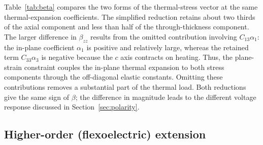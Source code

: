 \documentclass[a4paper, 11pt, twoside]{article}
\begin{document}
\begin{table}[h]
\centering
\caption{Plane-strain thermal-stress vector: simplified reduction versus the full
three-dimensional contraction, both evaluated at the same thermal-expansion
coefficients
($\alpha_1=+21.8\times10^{-6}\,\text{K}^{-1}$, $\alpha_3=-4.3\times10^{-6}\,\text{K}^{-1}$).}
\label{tab:beta}
\end{table}

Table~\ref{tab:beta} compares the two forms of the thermal-stress vector at the same
thermal-expansion coefficients. The simplified reduction retains about two thirds of
the axial component and less than half of the through-thickness component. The larger
difference in $\beta_{zz}$ results from the omitted contribution involving
$C_{13}\alpha_1$: the in-plane coefficient $\alpha_1$ is positive and relatively large,
whereas the retained term $C_{33}\alpha_3$ is negative because the $c$ axis contracts
on heating. Thus, the plane-strain constraint couples the in-plane thermal expansion
to both stress components through the off-diagonal elastic constants. Omitting these
contributions removes a substantial part of the thermal load. Both reductions give the
same sign of $\beta$; the difference in magnitude leads to the different voltage
response discussed in Section~\ref{sec:polarity}.

\subsection{Higher-order (flexoelectric) extension}
\label{sec:flexo}
\end{document}
